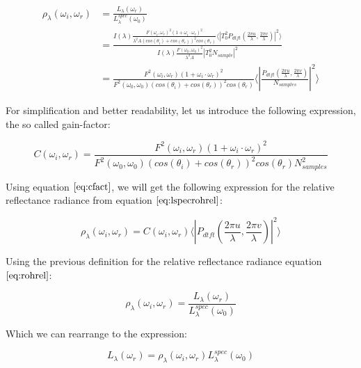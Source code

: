 \begin{align}
\rho_\lambda(\omega_i,\omega_r)
& = \frac{L_\lambda(\omega_r)}{L_\lambda^{spec}(\omega_0)} \nonumber \\
& = \frac{I(\lambda) \frac{F(\omega_i, \omega_r)^2 (1 + \omega_i \cdot \omega_r)^2}{\lambda^2 A (cos(\theta_i)+cos(\theta_r))^2 cos(\theta_r)} \langle \left|T_0^2 P_{dtft}(\frac{2\pi u}{\lambda}, \frac{2\pi v}{\lambda}) \right|^2\rangle}{I(\lambda) \frac{F(\omega_0, \omega_0)^2}{\lambda^2 A}\left| T_0^2 N_{sample} \right|^2 } \nonumber \\
& = \frac{F^2(\omega_i,\omega_r)(1 + \omega_i \cdot \omega_r)^2}{F^2(\omega_0,\omega_0)(cos(\theta_i)+cos(\theta_r))^2 cos(\theta_r)} \langle \left|\frac{P_{dtft}(\frac{2\pi u}{\lambda}, \frac{2\pi v}{\lambda})}{N_{samples}}\right|^2\rangle
\label{eq:lspecrohrel}
\end{align}

For simplification and better readability, let us introduce the following expression, the so called gain-factor:

\begin{equation} 
    C(\omega_i,\omega_r) = \frac{F^2(\omega_i,\omega_r)(1 + \omega_i \cdot \omega_r)^2}{F^2(\omega_0,\omega_0)(cos(\theta_i)+cos(\theta_r))^2 cos(\theta_r) N_{samples}^2}
\label{eq:cfact}
\end{equation}

Using equation $\ref{eq:cfact}$, we will get the following expression for the relative reflectance radiance from equation $\ref{eq:lspecrohrel}$:

\begin{equation}
\rho_\lambda(\omega_i,\omega_r) =  C(\omega_i,\omega_r) \langle \left|P_{dtft}(\frac{2\pi u}{\lambda}, \frac{2\pi v}{\lambda})\right|^2\rangle
\label{eq:cpterm}
\end{equation}

Using the previous definition for the relative reflectance radiance equation $\ref{eq:rohrel}$:

\begin{equation}
 \rho_\lambda(\omega_i,\omega_r) = \frac{L_\lambda(\omega_r)}{L_\lambda^{spec}(\omega_0)} 
\end{equation}

Which we can rearrange to the expression: 

\begin{equation}
L_\lambda(\omega_r) = \rho_\lambda(\omega_i,\omega_r)L_\lambda^{spec}(\omega_0)
\label{eq:radianceomegarspec}
\end{equation}


